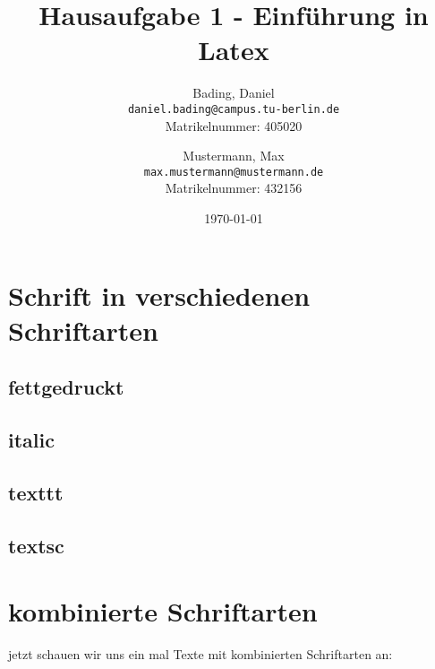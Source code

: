 \documentclass{article}
\title{Hausaufgabe 1 - Einführung in Latex}
\author{
  Bading, Daniel\\
  \texttt{daniel.bading@campus.tu-berlin.de}\\
  Matrikelnummer: 405020
  \and
  Mustermann, Max\\
  \texttt{max.mustermann@mustermann.de} \\
  Matrikelnummer: 432156
  }
\date{\today}
\begin{document}
\maketitle

\newpage

\tableofcontents

\newpage


\section{Schrift in verschiedenen Schriftarten}

\subsection{fettgedruckt}

\begin{textbf}
\blindtext
\end{textbf}

\subsection{italic}

\begin{textit}
\blindtext
\end{textit}

\subsection{texttt}
\begin{texttt}
\blindtext  
\end{texttt}

\subsection{textsc}

\begin{textsc}
\blindtext
\end{textsc}

\newpage

\section{kombinierte Schriftarten}

jetzt schauen wir uns ein mal Texte mit kombinierten Schriftarten an: \\
\end{document}
